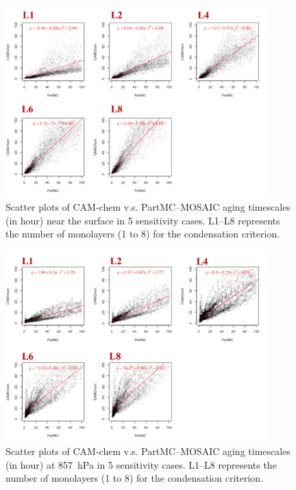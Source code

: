 \documentclass[12pt, fullpage]{uiucthesis2009_2}
\begin{document}
	\begin{figure}[h] 
		\begin{center}
			\includegraphics[width = 0.9\textwidth]{Figure34}
			\caption[Scatter plots of CAM-chem v.s. PartMC--MOSAIC aging timescales (in hour) near the surface in 5 sensitivity cases. L1--L8 represents the number of monolayers (1 to 8) for the condensation criterion]{\label{fig_p34} Scatter plots of CAM-chem v.s. PartMC--MOSAIC aging timescales (in hour) near the surface in 5 sensitivity cases. L1--L8 represents the number of monolayers (1 to 8) for the condensation criterion.}
		\end{center}
	\end{figure}
	
	
	\begin{figure}[h] 
		\begin{center}
			\includegraphics[width = 0.9\textwidth]{Figure35}
			\caption[Scatter plots of CAM-chem v.s. PartMC--MOSAIC aging timescales (in hour) at 857~hPa in 5 sensitivity cases. L1--L8 represents the number of monolayers (1 to 8) for the condensation criterion]{\label{fig_p35} Scatter plots of CAM-chem v.s. PartMC--MOSAIC aging timescales (in hour) at 857~hPa in 5 sensitivity cases. L1--L8 represents the number of monolayers (1 to 8) for the condensation criterion.}
		\end{center}
	\end{figure}
	
\end{document}
